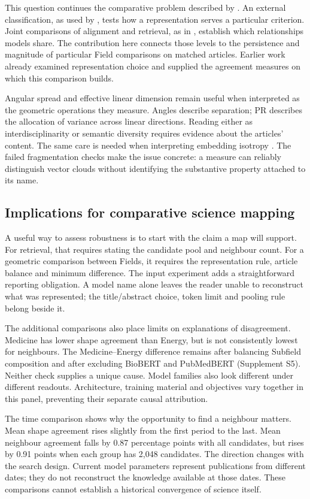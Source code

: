 \documentclass[12pt]{article}
\begin{document}
This question continues the comparative problem described by \citet{refa0d2d707e6,ref6a2f5912bc}. An external classification, as used by \citet{refc0e2cc29e0}, tests how a representation serves a particular criterion. Joint comparisons of alignment and retrieval, as in \citet{ref4e1e0d5582}, establish which relationships models share. The contribution here connects those levels to the persistence and magnitude of particular Field comparisons on matched articles. Earlier work already examined representation choice and supplied the agreement measures on which this comparison builds.

Angular spread and effective linear dimension remain useful when interpreted as the geometric operations they measure. Angles describe separation; PR describes the allocation of variance across linear directions. Reading either as interdisciplinarity or semantic diversity requires evidence about the articles' content. The same care is needed when interpreting embedding isotropy \citep{rudman-etal-2022-isoscore}. The failed fragmentation checks make the issue concrete: a measure can reliably distinguish vector clouds without identifying the substantive property attached to its name.

\subsection{Implications for comparative science mapping}
A useful way to assess robustness is to start with the claim a map will support. For retrieval, that requires stating the candidate pool and neighbour count. For a geometric comparison between Fields, it requires the representation rule, article balance and minimum difference. The input experiment adds a straightforward reporting obligation. A model name alone leaves the reader unable to reconstruct what was represented; the title/abstract choice, token limit and pooling rule belong beside it.

The additional comparisons also place limits on explanations of disagreement. Medicine has lower shape agreement than Energy, but is not consistently lowest for neighbours. The Medicine--Energy difference remains after balancing Subfield composition and after excluding BioBERT and PubMedBERT (Supplement S5). Neither check supplies a unique cause. Model families also look different under different readouts. Architecture, training material and objectives vary together in this panel, preventing their separate causal attribution.

The time comparison shows why the opportunity to find a neighbour matters. Mean shape agreement rises slightly from the first period to the last. Mean neighbour agreement falls by 0.87 percentage points with all candidates, but rises by 0.91 points when each group has 2,048 candidates. The direction changes with the search design. Current model parameters represent publications from different dates; they do not reconstruct the knowledge available at those dates. These comparisons cannot establish a historical convergence of science itself.
\end{document}

